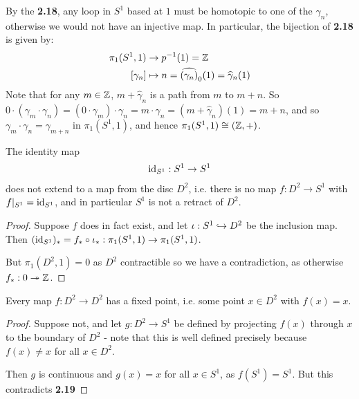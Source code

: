 \documentclass[10pt,a4paper]{article}
\begin{document}
By the \textbf{2.18}, any loop in $S^1$ based at $1$ must be homotopic to one of the $\gamma_n$, otherwise we would not have an injective map. In particular, the bijection of \textbf{2.18} is given by:
\begin{align*}
\pi_1(S^1,1) &\to p^{-1}(1) = \mathbb{Z}\\
[\gamma_n] &\mapsto n = \widehat{(\gamma_n)}_0 (1) = \widehat{\gamma}_n (1)
\end{align*}
Note that for any $m \in \mathbb{Z}$, $m+\hat{\gamma}_n$ is a path from $m$ to $m+n$. So $0 \cdot (\gamma_m\cdot \gamma_n) = (0\cdot \gamma_m)\cdot \gamma_n = m\cdot \gamma_n = (m+\hat{\gamma}_n)(1) = m+n$, and so $\gamma_m \cdot \gamma_n = \gamma_{m+n}$ in $\pi_1(S^1, 1)$, and hence $\pi_1(S^1, 1) \cong (\mathbb{Z},+)$. 

\begin{theorem}
The identity map
\begin{align*}
\operatorname{id}_{S^1}:S^1\to S^1
\end{align*}
does not extend to a map from the disc $D^2$, i.e. there is no map $f:D^2 \to S^1$ with $f|_{S^1} = \operatorname{id}_{S^1}$, and in particular $S^1$ is not a retract of $D^2$.
\end{theorem}
\begin{proof}
Suppose $f$ does in fact exist, and let $\iota:S^1 \hookrightarrow D^2$ be the inclusion map. Then $(\operatorname{id}_{S^1})_\ast = f_\ast \circ \iota_\ast : \pi_1(S^1, 1)\to \pi_1(S^1,1)$.

But $\pi_1(D^2,1) = 0$ as $D^2$ contractible so we have a contradiction, as otherwise $f_\ast : 0 \twoheadrightarrow \mathbb{Z}$.
\end{proof}
\begin{theorem}
Every map $f:D^2 \to D^2$ has a fixed point, i.e. some point $x\in D^2$ with $f(x) = x$.
\end{theorem}
\begin{proof}
Suppose not, and let $g:D^2 \to S^1$ be defined by projecting $f(x)$ through $x$ to the boundary of $D^2$ - note that this is well defined precisely because $f(x) \neq x$ for all $x \in D^2$.
\begin{center}
\end{center}%
Then $g$ is continuous and $g(x) = x$ for all $x \in S^1$, as $f(S^1) = S^1$. But this contradicts \textbf{2.19}
\end{proof}
\end{document}
